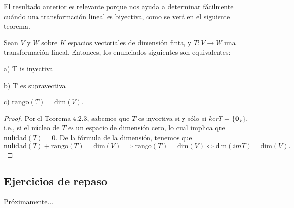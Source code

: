 \documentclass[12pt]{article}
\newenvironment{teorema}[2][Teorema]{\begin{trivlist}
\item[\hskip \labelsep {\bfseries #1}\hskip \labelsep {\bfseries #2.}]}{\end{trivlist}}
\begin{document}
El resultado anterior es relevante porque nos ayuda a determinar fácilmente cuándo una transformación lineal es biyectiva, como se verá en el siguiente teorema.

\begin{teorema} {5.3.2}
    Sean $V$ y $W$ sobre $K$ espacios vectoriales de dimensión finta, y $T:V\to W$ una transformación lineal. Entonces, los enunciados siguientes son equivalentes:

    \hspace{3mm} a) T is inyectiva

    \hspace{3mm} b) T es suprayectiva

    \hspace{3mm} c) $\text{rango}(T)=\text{dim}(V).$

\begin{proof}
    Por el Teorema 4.2.3, sabemos que $T$ es inyectiva si y sólo si $kerT=\{\mathbf{0}_V\}$, i.e., si el núcleo de $T$ es un espacio de dimensión cero, lo cual implica que $\text{nulidad}(T)=0.$ De la fórmula de la dimensión, tenemos que $\text{nulidad}(T)+\text{rango}(T)=\text{dim}(V)\implies \text{rango}(T)=\text{dim}(V)\iff \text{dim}(imT)=\text{dim}(V).$ 
\end{proof}

\end{teorema}

\subsection{Ejercicios de repaso}

Próximamente...
\end{document}
